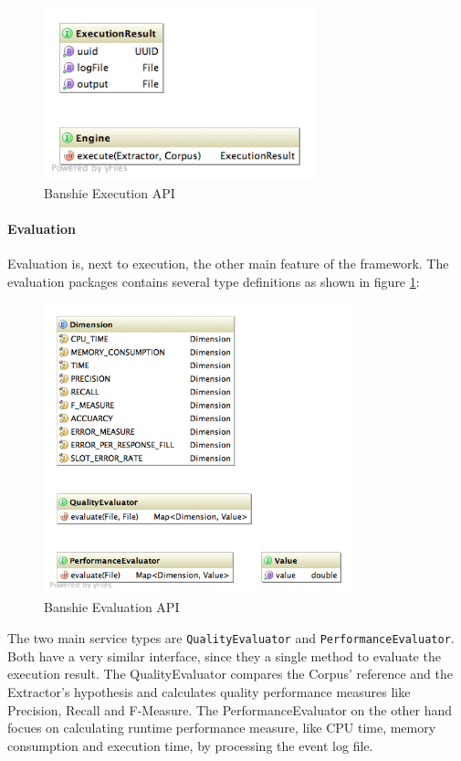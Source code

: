 \begin{figure}[H]
\centering
\includegraphics[width=0.7\textwidth]{api-execution.png}
\caption{Banshie Execution API}
\end{figure}

\newpage
\paragraph{Evaluation}
Evaluation is, next to execution, the other main feature of the framework. The evaluation packages contains several type definitions as shown in figure \ref{fig:evaluation-api}:

\begin{figure}[H]
\centering
\includegraphics[width=0.8\textwidth]{api-evaluation.png}
\caption{Banshie Evaluation API}
\label{fig:evaluation-api}
\end{figure}

The two main service types are \texttt{QualityEvaluator} and \texttt{PerformanceEvaluator}. Both have a very similar interface, since they a single method to evaluate the execution result. The QualityEvaluator compares the Corpus' reference and the Extractor's hypothesis and calculates quality performance measures like Precision, Recall and F-Measure. The PerformanceEvaluator on the other hand focues on calculating runtime performance measure, like CPU time, memory consumption and execution time, by processing the event log file.

